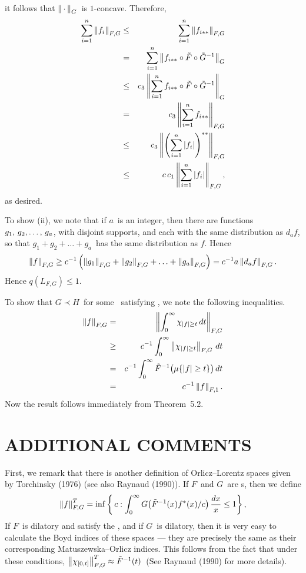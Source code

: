 it follows that $\left\| \,\cdot\, \right\|_G$\ is $1$-concave. Therefore,
\begin{eqnarray*}
   \sum_{i=1}^n \left\| f_i \right\|_{F,G}
   &\le& \sum_{i=1}^n \left\| f_{i**} \right\|_{F,G} \\
   &=& \sum_{i=1}^n \left\| f_{i**}\circ \tilde F \circ\tilde G^{-1} \right\|_G \\
   &\le& c_3 \left\| \sum_{i=1}^n f_{i**}\circ \tilde F \circ\tilde 
         G^{-1} \right\|_G \\
   &=& c_3 \left\| \sum_{i=1}^n f_{i**} \right\|_{F,G} \\
   &\le& c_3 \left\| \left(\sum_{i=1}^n \left| f_i \right|\right)^{**} \right\|_{F,G} \\
   &\le& c\, c_1 \left\| \sum_{i=1}^n \left| f_i \right| \right\|_{F,G} ,
\end{eqnarray*}
as desired.

To show (ii), we note that if $a$\ is an integer, then there
are functions $\listit g,a$, with disjoint supports, and each with the
same distribution as $d_a f$, so that $g_1+g_2+\ldots+g_a$\ has the same
distribution as $f$. Hence
$$ \left\| f \right\|_{F,G}
   \ge c^{-1} \left( \left\| g_1 \right\|_{F,G} + \left\| g_2 \right\|_{F,G}
   + \ldots + \left\| g_a \right\|_{F,G} \right)
   = c^{-1} a \left\| d_a f \right\|_{F,G} .$$
Hence $q(L_{F,G}) \le 1$.

To show that $G\prec H$\ for some \Nfunction\ satisfying
\conditionJ, we note the following inequalities.
\begin{eqnarray*}
   \left\| f \right\|_{F,G} &=& \left\| \int_0^\infty \chi_{\left| f \right| \ge t} 
                      \,dt \right\|_{F,G} \\
            &\ge& c^{-1} \int_0^\infty \left\| \chi_{\left| f \right| 
                  \ge t} \right\|_{F,G} \,dt \\
            &=& c^{-1} \int_0^\infty \tilde F^{-1}\bigl(
                \mu\{\left| f \right| \ge t\}\bigr)
                \,dt \\
            &=& c^{-1} \left\| f \right\|_{F,1} .
\end{eqnarray*}
Now the result follows immediately from Theorem~5.2.
\endproof

\section{ADDITIONAL COMMENTS}

First, we remark that there is another definition of Orlicz--Lorentz spaces
given by Torchinsky (1976) (see also Raynaud (1990)). If $F$\ and
$G$\ are \phifunction s, then we define 
$$    \left\| f \right\|_{F,G}^T
   = \inf \left\{\, c :
     \int_0^\infty G\bigl(\tilde F^{-1}(x) f^*(x)/c\bigr)
     \, {dx\over x} \le 1 \right\} ,$$
If $F$\ is dilatory and satisfy the \Deltacond, and if $G$\ is dilatory,
then it is very easy to calculate the Boyd indices of these spaces --- 
they are
precisely the same as their corresponding Matuszewska--Orlicz indices. This
follows from the fact that under these conditions, 
$ \left\| \chi_{[0,t]} \right\|_{F,G}^T \approx \tilde F^{-1}(t) $\ 
(See Raynaud (1990) for more
details).

